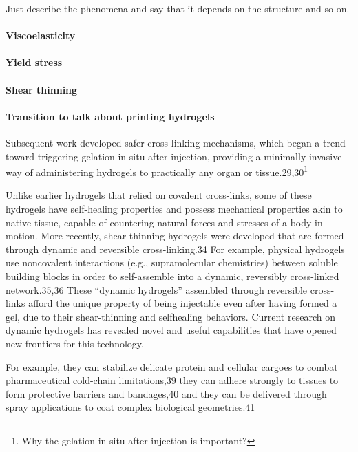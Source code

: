 Just describe the phenomena and say that it depends on the structure and so on.

\paragraph{Viscoelasticity}

\paragraph{Yield stress}

\paragraph{Shear thinning}


\paragraph{Transition to talk about printing hydrogels}\citep{correaTranslationalApplicationsHydrogels2021}
Subsequent work developed safer cross-linking mechanisms, which began a trend toward triggering gelation in situ after injection, providing a minimally invasive way of administering  hydrogels to practically any organ or tissue.29,30\footnote{Why the gelation in situ after injection is important?}

Unlike earlier hydrogels that relied on covalent cross-links, some of these hydrogels have self-healing properties and possess mechanical properties akin to native tissue, capable of countering natural forces and stresses of a body in motion.
More recently, shear-thinning hydrogels were developed that are formed through dynamic and reversible cross-linking.34 
For example, physical hydrogels use noncovalent interactions (e.g., supramolecular chemistries) between soluble building blocks in order to self-assemble into a dynamic, reversibly cross-linked  network.35,36 
These “dynamic hydrogels” assembled through reversible cross-links afford the unique property of being injectable even after having formed a gel, due to their shear-thinning and selfhealing behaviors. 
Current research on dynamic hydrogels has revealed novel and useful capabilities that have opened new frontiers for this technology. 

For example, they can stabilize delicate protein and cellular cargoes to combat pharmaceutical  cold-chain limitations,39 they can adhere strongly to tissues to  form protective barriers and bandages,40 and they can be delivered through spray applications to coat complex biological  geometries.41

